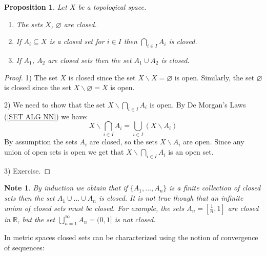 \documentclass[11pt, letterpaper, oneside]{report}
\theoremstyle{pplain}
\newtheorem{proposition}[theorem]{Proposition}
\newtheorem{ITERMVALUE THM}[theorem]{Intermediate Value Theorem}
\newtheorem{HEINEBOREL THM}[theorem]{Heine-Borel Theorem}
\newtheorem{UMETR THM}[theorem]{Urysohn Metrization Theorem}
\newtheorem{UMETR2 THM}[theorem]{Urysohn Metrization Theorem (v.2)}
\theoremstyle{ddefinition}
\newtheorem{note}[theorem]{Note}
\theoremstyle{nnn}
\newtheorem{TDA NN}[theorem]{Topological Data Analysis. }
\theoremstyle{eexercise}
\newcommand{\R}{{\mathbb R}}
\newcommand{\ssmin}{\smallsetminus}
\newcommand{\benu}{\begin{enumerate}}
\newcommand{\eenu}{\end{enumerate}}
\begin{document}
\begin{proposition}
\label{CLOSED SETS PROP}
Let $X$ be a topological space. 
\benu
\item The sets $X$, $\varnothing$ are closed. 
\item If $A_{i}\subseteq X$ is a closed set for $i\in I$ then $\bigcap_{i\in I} A_{i}$ is closed. 
\item If $A_{1}$, $A_{2}$ are closed sets then the set $A_{1}\cup A_{2}$ is   closed. 
\eenu
\end{proposition}
 
 \begin{proof}
1) The set $X$ is closed since the set $X\ssmin X = \varnothing$ is open. Similarly, the set 
$\varnothing$ is closed since the set $X\ssmin \varnothing = X$ is open. 

2) We need to show that the set $X\ssmin \bigcap_{i\in I} A_{i}$ is open. By De Morgan's Laws
(\ref{SET ALG NN}) we have:
$$X\ssmin \bigcap_{i\in I} A_{i} = \bigcup_{i\in I} (X\ssmin A_{i})$$
By assumption the sets $A_{i}$ are closed, so the sets $X\ssmin A_{i}$ are open. Since any 
union of open sets is open we get that $X\ssmin \bigcap_{i\in I} A_{i}$ is an open set. 

3) Exercise. 
 \end{proof}
 
 \begin{note}
 By induction we obtain that if $\{A_{1}, \dots, A_{n}\}$ is a finite collection of closed sets then the set 
 $A_{1}\cup \dots \cup A_{n}$ is closed.  
 It is not true though that an infinite union of closed sets must be  closed. 
 For example, the sets $A_{n} = [\tfrac{1}{n}, 1]$ are closed in $\R$, but the set 
 $\bigcup_{n=1}^{\infty}A_{n} = (0, 1]$ is not closed. 
 \end{note}
 
 In metric spaces closed sets can be characterized using  the notion of convergence of sequences:
\end{document}
